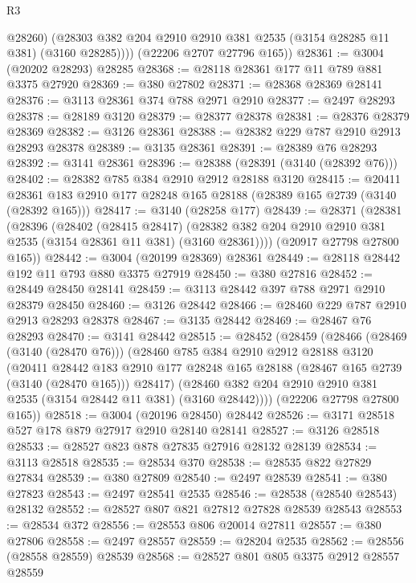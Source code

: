 \begin{lexlean}{R3}
\begin{coremodule}
            @28260)
          (@28303 @382 @204 @2910 @2910 @381 @2535 (@3154 @28285 @11 @381) (@3160 @28285))))
      (@22206 @2707 @27796 @165))
@28361 := @3004 (@20202 @28293) @28285
@28368 := @28118 @28361 @177 @11 @789 @881 @3375 @27920
@28369 := @380 @27802
@28371 := @28368 @28369 @28141
@28376 := @3113 @28361 @374 @788 @2971 @2910
@28377 := @2497 @28293
@28378 := @28189 @3120
@28379 := @28377 @28378
@28381 := @28376 @28379 @28369
@28382 := @3126 @28361
@28388 := @28382 @229 @787 @2910 @2913 @28293 @28378
@28389 := @3135 @28361
@28391 := @28389 @76 @28293
@28392 := @3141 @28361
@28396 := @28388 (@28391 (@3140 (@28392 @76)))
@28402 := @28382 @785 @384 @2910 @2912 @28188 @3120
@28415 := @20411 @28361 @183 @2910 @177 @28248 @165 @28188 (@28389 @165 @2739 (@3140 (@28392 @165)))
@28417 := @3140 (@28258 @177)
@28439 := @28371
    (@28381
      (@28396
        (@28402
          (@28415 @28417)
          (@28382 @382 @204 @2910 @2910 @381 @2535 (@3154 @28361 @11 @381) (@3160 @28361))))
      (@20917 @27798 @27800 @165))
@28442 := @3004 (@20199 @28369) @28361
@28449 := @28118 @28442 @192 @11 @793 @880 @3375 @27919
@28450 := @380 @27816
@28452 := @28449 @28450 @28141
@28459 := @3113 @28442 @397 @788 @2971 @2910 @28379 @28450
@28460 := @3126 @28442
@28466 := @28460 @229 @787 @2910 @2913 @28293 @28378
@28467 := @3135 @28442
@28469 := @28467 @76 @28293
@28470 := @3141 @28442
@28515 := @28452
    (@28459
      (@28466
        (@28469 (@3140 (@28470 @76)))
        (@28460
          @785
          @384
          @2910
          @2912
          @28188
          @3120
          (@20411
            @28442
            @183
            @2910
            @177
            @28248
            @165
            @28188
            (@28467 @165 @2739 (@3140 (@28470 @165)))
            @28417)
          (@28460 @382 @204 @2910 @2910 @381 @2535 (@3154 @28442 @11 @381) (@3160 @28442))))
      (@22206 @27798 @27800 @165))
@28518 := @3004 (@20196 @28450) @28442
@28526 := @3171 @28518 @527 @178 @879 @27917 @2910 @28140 @28141
@28527 := @3126 @28518
@28533 := @28527 @823 @878 @27835 @27916 @28132 @28139
@28534 := @3113 @28518
@28535 := @28534 @370
@28538 := @28535 @822 @27829 @27834
@28539 := @380 @27809
@28540 := @2497 @28539
@28541 := @380 @27823
@28543 := @2497 @28541 @2535
@28546 := @28538 (@28540 @28543) @28132
@28552 := @28527 @807 @821 @27812 @27828 @28539 @28543
@28553 := @28534 @372
@28556 := @28553 @806 @20014 @27811
@28557 := @380 @27806
@28558 := @2497 @28557
@28559 := @28204 @2535
@28562 := @28556 (@28558 @28559) @28539
@28568 := @28527 @801 @805 @3375 @2912 @28557 @28559

\end{coremodule}
\end{lexlean}
